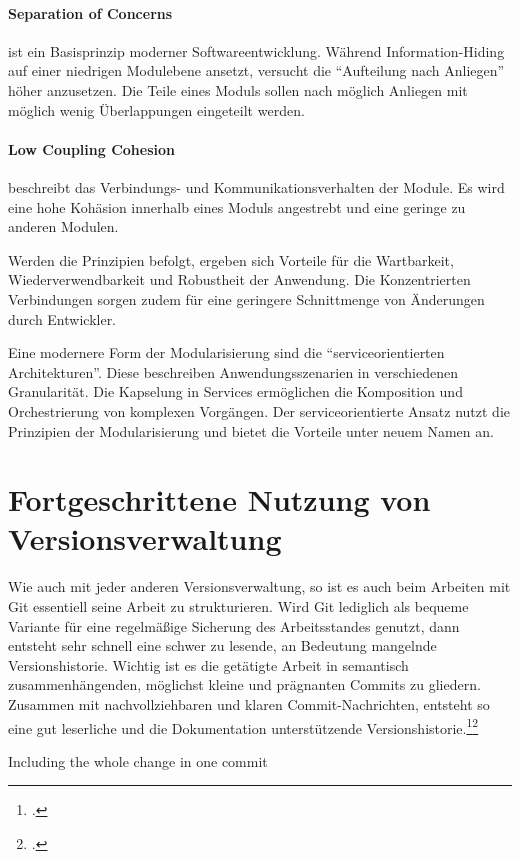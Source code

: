 \paragraph{Separation of Concerns} ist ein Basisprinzip moderner Softwareentwicklung. Während Information-Hiding auf einer niedrigen Modulebene ansetzt, versucht die ``Aufteilung nach Anliegen'' höher anzusetzen. Die Teile eines Moduls sollen nach möglich Anliegen  mit möglich wenig Überlappungen eingeteilt werden. 
\paragraph{Low Coupling Cohesion} beschreibt das Verbindungs- und Kommunikationsverhalten der Module. Es wird eine hohe Kohäsion innerhalb eines Moduls angestrebt und eine geringe zu anderen Modulen.

Werden die Prinzipien befolgt, ergeben sich Vorteile für die Wartbarkeit, Wiederverwendbarkeit und Robustheit der Anwendung. Die Konzentrierten Verbindungen sorgen zudem für eine geringere Schnittmenge von Änderungen durch Entwickler.

Eine modernere Form der Modularisierung sind die ``serviceorientierten Architekturen''. Diese beschreiben Anwendungsszenarien in verschiedenen Granularität. Die Kapselung in Services ermöglichen die Komposition und Orchestrierung von komplexen Vorgängen. Der serviceorientierte Ansatz nutzt die Prinzipien der Modularisierung und bietet die Vorteile unter neuem Namen an.

\section{Fortgeschrittene Nutzung von Versionsverwaltung}
Wie auch mit jeder anderen Versionsverwaltung, so ist es auch beim Arbeiten mit Git essentiell seine Arbeit zu strukturieren. Wird Git lediglich als bequeme Variante für eine regelmäßige Sicherung des Arbeitsstandes genutzt, dann entsteht sehr schnell eine schwer zu lesende, an Bedeutung mangelnde Versionshistorie. Wichtig ist es die getätigte Arbeit in semantisch zusammenhängenden, möglichst kleine und prägnanten Commits zu gliedern.
Zusammen mit nachvollziehbaren und klaren Commit-Nachrichten, entsteht so eine gut leserliche und die Dokumentation unterstützende Versionshistorie.\footcite[Making only one change per commit][]{git-essentials-2017}\footcite[Writing commit messages before starting to code][]{git-essentials-2017}

Including the whole change in one commit

